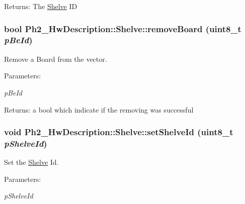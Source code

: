 \begin{Desc}
\item[Returns:]The \hyperlink{class_ph2___hw_description_1_1_shelve}{Shelve} ID \end{Desc}
\hypertarget{class_ph2___hw_description_1_1_shelve_d0d5bb55bdf8e6629cdc919685ffb8f9}{
\subsubsection[removeBoard]{\setlength{\rightskip}{0pt plus 5cm}bool Ph2\_\-Hw\-Description::Shelve::remove\-Board (uint8\_\-t {\em p\-Be\-Id})}}
\label{class_ph2___hw_description_1_1_shelve_d0d5bb55bdf8e6629cdc919685ffb8f9}


Remove a Board from the vector. 

\begin{Desc}
\item[Parameters:]
\begin{description}
\item[{\em p\-Be\-Id}]\end{description}
\end{Desc}
\begin{Desc}
\item[Returns:]a bool which indicate if the removing was successful \end{Desc}
\hypertarget{class_ph2___hw_description_1_1_shelve_7f333a3851b7605ea7b5e87441eb6640}{
\subsubsection[setShelveId]{\setlength{\rightskip}{0pt plus 5cm}void Ph2\_\-Hw\-Description::Shelve::set\-Shelve\-Id (uint8\_\-t {\em p\-Shelve\-Id})}}
\label{class_ph2___hw_description_1_1_shelve_7f333a3851b7605ea7b5e87441eb6640}


Set the \hyperlink{class_ph2___hw_description_1_1_shelve}{Shelve} Id. 

\begin{Desc}
\item[Parameters:]
\begin{description}
\item[{\em p\-Shelve\-Id}]\end{description}
\end{Desc}


